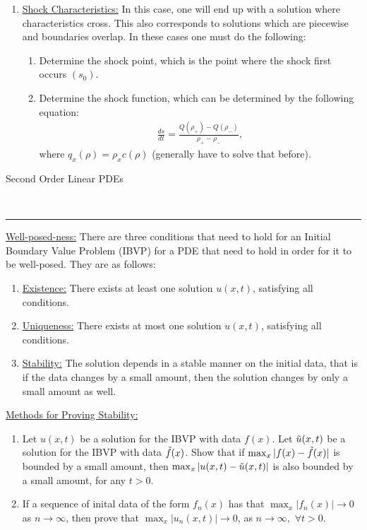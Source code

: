 \documentclass{article}
\newcommand{\header}[1]{\begin{large}\noindent #1\end{large}\\\rule{\textwidth}{0.5pt}}
\newcommand{\sheader}[1]{\underline{#1:}}
\begin{document}
\begin{enumerate}
\begin{enumerate}
\begin{enumerate}
        \end{enumerate}
        \item \sheader{Shock Characteristics} In this case, one will end up with a solution
        where characteristics cross. This also corresponds to solutions which are
        piecewise and boundaries overlap. In these cases one must do the following:
        \begin{enumerate}
            \item Determine the shock point, which is the point where the shock 
            first occurs $(s_0)$.
            \item Determine the shock function, which can be determined by the 
            following equation:
            \begin{align*}
                \frac{ds}{dt} = \frac{Q(\rho_+)  - Q(\rho_-)}{\rho_+ - \rho_-},
            \end{align*}
            where $q_x(\rho) = \rho_x c(\rho)$ (generally have to solve that before).
        \end{enumerate}
    \end{enumerate}
\end{enumerate}

\header{Second Order Linear PDEs}
\sheader{Well-posed-ness} There are three conditions that need to hold for an Initial Boundary Value Problem 
(IBVP) for a PDE that need to hold in order for it to be well-posed. They 
are as follows:
\begin{enumerate}
    \item \sheader{Existence} There exists at least one solution $u(x, t)$,
    satisfying all conditions.
    \item \sheader{Uniqueness} There exists at most one solution $u(x, t)$,
    satisfying all conditions.
    \item \sheader{Stability} The solution depends in a stable manner on the 
    initial data, that is if the data changes by a small amount, then the solution 
    changes by only a small amount as well.
\end{enumerate}
\sheader{Methods for Proving Stability}
\begin{enumerate}
    \item Let $u(x, t)$ be a solution for the IBVP with data $f(x)$. Let 
    $\Tilde{u}(x, t)$ be a solution for the IBVP with data $\Tilde{f}(x)$.
    Show that if $\max_x |f(x) - \Tilde{f}(x)|$ is bounded by a small amount, 
    then $\max_x |u(x, t) - \Tilde{u}(x, t)|$ is also bounded by a small amount,
    for any $t > 0$.
    \item If a sequence of inital data of the form $f_n(x)$ has that 
    $\max_x |f_n(x)| \to 0$ as $n\to \infty$, then prove that $\max_x|u_n(x, t)| \to 0$,
    as $n\to \infty, \,\, \forall t > 0$.
    
\end{enumerate}
\end{document}
